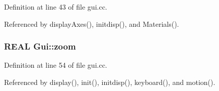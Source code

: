 Definition at line 43 of file gui.cc.

Referenced by displayAxes(), initdisp(), and Materials().\hypertarget{namespaceGui_0da4588637a3890172d5a43efb250048}{
\subsubsection[{zoom}]{\setlength{\rightskip}{0pt plus 5cm}REAL {\bf Gui::zoom}}}
\label{namespaceGui_0da4588637a3890172d5a43efb250048}




Definition at line 54 of file gui.cc.

Referenced by display(), init(), initdisp(), keyboard(), and motion().